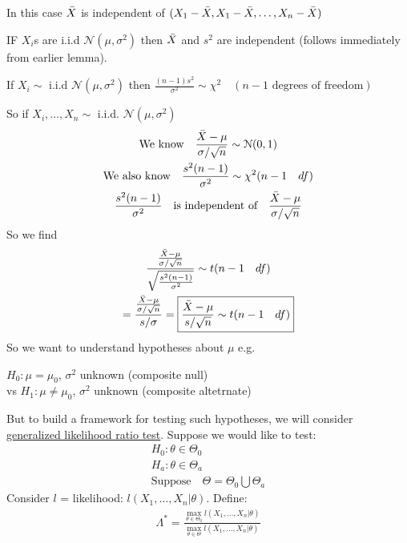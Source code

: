 
\begin{lemma}
	In this case $\bar{X}$ is independent of $(X_1 - \bar{X}, X_1 - \bar{X}, \ldots, X_n - \bar{X})$
\end{lemma}
\begin{lemma}
	IF $X_i$s are i.i.d $\mathcal{N}(\mu, \sigma^2)$ then $\bar{X}$ and $s^2$ are independent (follows immediately from earlier lemma).
\end{lemma}
\begin{lemma}
	If $X_i \sim $ i.i.d $\mathcal{N}(\mu, \sigma^2)$ then $\frac{(n-1)s^2}{\sigma^2} \sim \chi^2 \quad (n-1 \text{ degrees of freedom})$
\end{lemma}
So if $X_i, \ldots, X_n \sim$ i.i.d. $\mathcal{N}(\mu, \sigma^2)$
\begin{gather*}
	\text{We  know} \quad	\frac{\bar{X} - \mu}{\sigma / \sqrt{n}} \sim \mathcal{N}(0,1)\\
	\text{We also know} \quad \frac{s^2 (n-1)}{\sigma^2} \sim \chi^2 (n-1 \quad df)\\
	\frac{s^2 (n-1)}{\sigma^2} \quad \text{is independent of} \quad \frac{\bar{X} - \mu}{\sigma / \sqrt{n}}
\end{gather*}
So we find
\begin{gather*}
	\frac{\frac{\bar{X} - \mu}{\sigma / \sqrt{n}}}{\sqrt{\frac{s^2 (n-1)}{\sigma^2}}} \sim t(n-1 \quad df)\\
	= \frac{\frac{\bar{X} - \mu}{\sigma / \sqrt{n}}}{s / \sigma} = \boxed{\frac{\bar{X} - \mu}{s / \sqrt{n}} \sim t(n-1 \quad df) }
\end{gather*}
So we want to understand hypotheses about $\mu$ e.g.
\begin{center}
	$H_0: \mu = \mu_0$, \quad $\sigma^2$ unknown (composite null)\\
	vs $H_1: \mu \neq \mu_0$, \quad $\sigma^2$ unknown (composite altetrnate)\\
\end{center}
But to build a framework for testing such hypotheses, we will consider \underline{generalized likelihood ratio test}. Suppose we would like to test:
\begin{gather*}
	H_0: \theta \in \Theta_0\\
		H_a: \theta \in \Theta_a\\
		\text{Suppose} \quad \Theta = \Theta_0 \bigcup \Theta_a
\end{gather*}
Consider $l$ = likelihood: $l(X_1, \ldots, X_n | \theta)$. Define:
\begin{gather*}
	\Lambda^* = \frac{\max\limits_{\theta \in \Theta_0} l(X_1, \ldots, X_n | \theta) }{\max\limits_{\theta \in \Theta} l(X_1, \ldots, X_n | \theta) }
\end{gather*}
